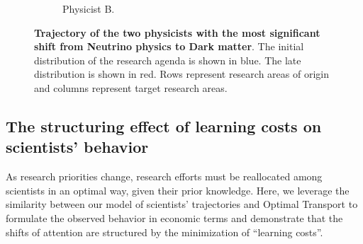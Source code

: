 \documentclass{article}
\begin{document}
\begin{figure}[h]
\begin{subfigure}{0.45\textwidth}
    \caption{Physicist B. %
    }
    \label{fig:J.F.Beacom.1}
\end{subfigure}
\caption{\textbf{Trajectory of the two physicists with the most significant shift from Neutrino physics to Dark matter}. The initial distribution of the research agenda is shown in blue. The late distribution is shown in red. Rows represent research areas of origin and columns represent target research areas.}
\label{fig:turns_neutrinos_dm}
\end{figure}

\subsection{\label{sec:optimal-transport}The structuring effect of learning costs on scientists' behavior}

As research priorities change, research efforts must be reallocated among scientists in an optimal way, given their prior knowledge. Here, we leverage the similarity between our model of scientists' trajectories and Optimal Transport \citep{muzellec2017tsallis,li2019learning} to formulate the observed behavior in economic terms and demonstrate that the shifts of attention are structured by the minimization of ``learning costs''. 
\end{document}
